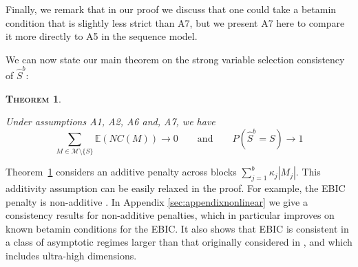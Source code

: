 \documentclass[aos]{imsart}
\theoremstyle{plain}
\newtheorem{thm}{\textsc{Theorem}}[section]
\newcommand{\E}{\mathbb{E}}
\begin{document}
Finally, we remark that in our proof we discuss that one could take a betamin condition that is slightly less strict than A7, but we present A7 here to compare it more directly to A5 in the sequence model.  

We can now state our main theorem on the strong variable selection consistency of $\hat{S}^{b}$:
\begin{thm}\label{theo:suffcondlinearmodel}

Under assumptions A1, A2, A6 and, A7, we have
$$\sum_{M \in \mathcal{M}\setminus \{S\}}\E\left(NC(M)\right)\to 0 \qquad \mbox{and} \qquad P(\hat{S}^b = S) \to 1$$
\end{thm}


Theorem~\ref{theo:suffcondlinearmodel} considers an additive penalty across blocks
$\sum_{j=1}^b \kappa_j|M_j|$. This additivity assumption can be easily relaxed in the proof. 
For example, the EBIC penalty is non-additive \citep{EBIC}.
In Appendix \ref{sec:appendixnonlinear} we give a consistency results for non-additive penalties, which in particular improves on known betamin conditions for the EBIC.
It also shows that EBIC is consistent in a class of asymptotic regimes larger than that originally considered in \cite{EBIC}, and which includes ultra-high dimensions.
\end{document}
